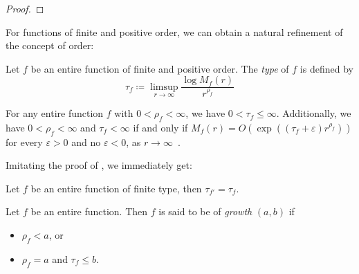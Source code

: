 \begin{proof}
\end{proof}

For functions of finite and positive order, we can obtain a natural refinement of the concept of order:

\begin{definition}
    Let $f$ be an entire function of finite and positive order. The \emph{type} of $f$ is defined by
    \begin{equation} \label{eq:def-type}
        \tau_f \coloneqq \limsup_{r \to \infty} \frac{\log M_f(r)}{r^{\rho_f}}
    \end{equation}
\end{definition}

For any entire function $f$ with $0 < \rho_f < \infty$, we have $0 < \tau_f \leq \infty$. Additionally, we have $0 < \rho_f < \infty$ and $\tau_f < \infty$ if and only if $M_f(r) = O(\exp((\tau_f + \varepsilon) r^{\rho_f}))$ for every $\varepsilon > 0$ and no $\varepsilon < 0$, as $r \to \infty$~\cite{segal-complex-analysis}.

Imitating the proof of , we immediately get:

\begin{proposition} \label{prop:type-derivative}
    Let $f$ be an entire function of finite type, then $\tau_{f'} = \tau_f$.
\end{proposition}

\begin{definition}
    Let $f$ be an entire function. Then $f$ is said to be of \emph{growth} $(a, b)$ if
    \begin{itemize}
        \item $\rho_f < a$, or
        \item $\rho_f = a$ and $\tau_f \leq b$.
    \end{itemize}
\end{definition}

\begin{example}
\end{example}